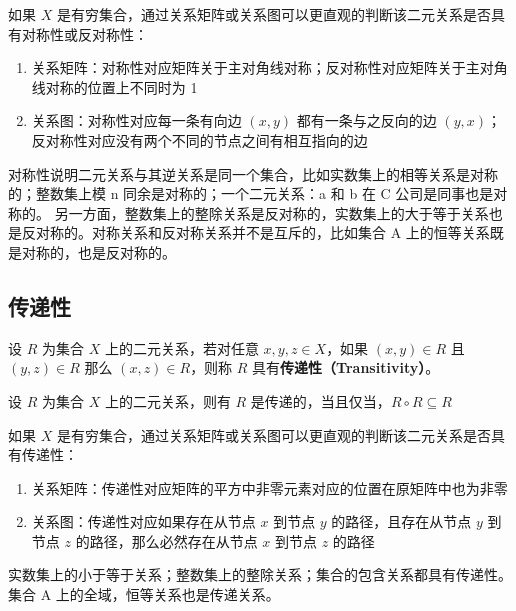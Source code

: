 \begin{note}
    如果 $ X $ 是有穷集合，通过关系矩阵或关系图可以更直观的判断该二元关系是否具有对称性或反对称性：
    \begin{enumerate}
        \item 关系矩阵：对称性对应矩阵关于主对角线对称；反对称性对应矩阵关于主对角线对称的位置上不同时为 1
        \item 关系图：对称性对应每一条有向边 $ (x,y) $ 都有一条与之反向的边 $ (y,x) $；反对称性对应没有两个不同的节点之间有相互指向的边
    \end{enumerate}
    对称性说明二元关系与其逆关系是同一个集合，比如实数集上的相等关系是对称的；整数集上模 n 同余是对称的；一个二元关系：a 和 b 在 C 公司是同事也是对称的。
    另一方面，整数集上的整除关系是反对称的，实数集上的大于等于关系也是反对称的。对称关系和反对称关系并不是互斥的，比如集合 A 上的恒等关系既是对称的，也是反对称的。
\end{note}

\subsection{传递性}
\begin{definition}
    设 $ R $ 为集合 $ X $ 上的二元关系，若对任意 $ x,y,z\in X $，如果 $ (x,y)\in R $ 且 $ (y,z)\in R $ 那么 $ (x,z)\in R $，则称 $ R $ 具有\textbf{传递性（Transitivity）}。
\end{definition}

\begin{proposition}
    设 $ R $ 为集合 $ X $ 上的二元关系，则有 $ R $ 是传递的，当且仅当，$ R\circ R \subseteq R $
\end{proposition}

\begin{note}
    如果 $ X $ 是有穷集合，通过关系矩阵或关系图可以更直观的判断该二元关系是否具有传递性：
    \begin{enumerate}
        \item 关系矩阵：传递性对应矩阵的平方中非零元素对应的位置在原矩阵中也为非零
        \item 关系图：传递性对应如果存在从节点 $ x $ 到节点 $ y $ 的路径，且存在从节点 $ y $ 到节点 $ z $ 的路径，那么必然存在从节点 $ x $ 到节点 $ z $ 的路径
    \end{enumerate}
    实数集上的小于等于关系；整数集上的整除关系；集合的包含关系都具有传递性。集合 A 上的全域，恒等关系也是传递关系。
\end{note}
\newpage